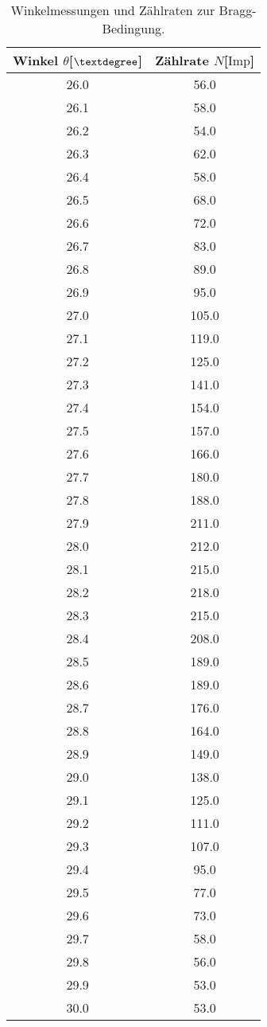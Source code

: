 \begin{table}
\centering
\caption{Winkelmessungen und Zählraten zur Bragg-Bedingung.}
\label{tab:ogemessdaten1}
\begin{tabular}{c c}
    \toprule
    Winkel $\theta$[$\textdegree$] & Zählrate $N$[$\text{Imp}$]\\
    \midrule
    26.0    &	56.0\\
    26.1    &	58.0\\
    26.2    &	54.0\\
    26.3    &	62.0\\
    26.4    &	58.0\\
    26.5    &	68.0\\
    26.6    &	72.0\\
    26.7    &	83.0\\
    26.8    &	89.0\\
    26.9    &	95.0\\
    27.0    &	105.0\\
    27.1    &	119.0\\
    27.2    &	125.0\\
    27.3    &	141.0\\
    27.4    &	154.0\\
    27.5    &	157.0\\
    27.6    &	166.0\\
    27.7    &	180.0\\
    27.8    &	188.0\\
    27.9    &	211.0\\
    28.0    &	212.0\\
    28.1    &	215.0\\
    28.2    &	218.0\\
    28.3    &	215.0\\
    28.4    &	208.0\\
    28.5    &	189.0\\
    28.6    &	189.0\\
    28.7    &	176.0\\
    28.8    &	164.0\\
    28.9    &	149.0\\
    29.0    &	138.0\\
    29.1    &	125.0\\
    29.2    &	111.0\\
    29.3    &	107.0\\
    29.4    &	95.0\\
    29.5    &	77.0\\
    29.6    &	73.0\\
    29.7    &	58.0\\
    29.8    &	56.0\\
    29.9    &	53.0\\
    30.0    &	53.0\\
    \bottomrule
\end{tabular}
\end{table}
